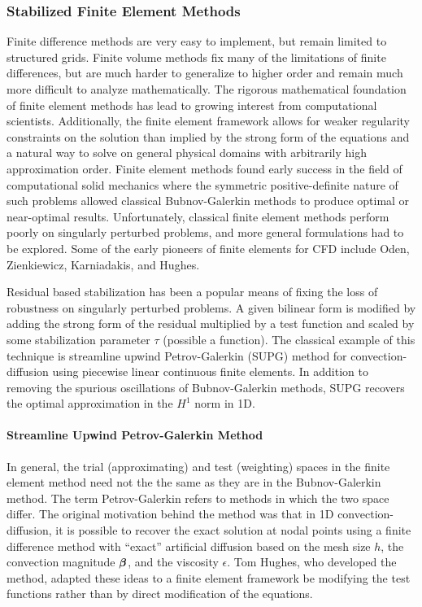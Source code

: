 \documentclass[Dissertation.tex]{subfiles}
\begin{document}
\subsubsection{Stabilized Finite Element Methods}
Finite difference methods are very easy to implement, but remain limited to structured grids.
Finite volume methods fix many of the limitations of finite differences,
but are much harder to generalize to higher order and remain much more difficult to analyze mathematically.
The rigorous mathematical foundation of finite element methods has lead to growing interest from computational scientists.
Additionally, the finite element framework allows for weaker regularity constraints on the solution than implied by the strong form of the equations
and a natural way to solve on general physical domains with arbitrarily high approximation order.
Finite element methods found early success in the field of computational solid mechanics where the symmetric positive-definite nature of such problems
allowed classical Bubnov-Galerkin methods to produce optimal or near-optimal results.
Unfortunately, classical finite element methods perform poorly on singularly perturbed problems,
and more general formulations had to be explored.
Some of the early pioneers of finite elements for CFD include Oden, Zienkiewicz, Karniadakis, and Hughes\cite{ChungCFD}.

Residual based stabilization has been a popular means of fixing the loss of robustness on singularly perturbed problems.
A given bilinear form is modified by adding the strong form of the residual multiplied by a test function and scaled by some
stabilization parameter $\tau$ (possible a function).
The classical example of this technique is streamline upwind Petrov-Galerkin (SUPG) method for convection-diffusion using piecewise linear
continuous finite elements\cite{SUPG}.
In addition to removing the spurious oscillations of Bubnov-Galerkin methods, SUPG recovers the optimal approximation in the $H^1$ norm in 1D.

\paragraph{Streamline Upwind Petrov-Galerkin Method}
In general, the trial (approximating) and test (weighting) spaces in the finite element method need not the the same as they are in the Bubnov-Galerkin method.
The term Petrov-Galerkin refers to methods in which the two space differ.
The original motivation behind the method was that in 1D convection-diffusion, it is possible to recover the exact solution at nodal points
using a finite difference method with ``exact'' artificial diffusion based on the mesh size $h$,
the convection magnitude $\boldsymbol\beta$, and the viscosity $\epsilon$.
Tom Hughes, who developed the method, adapted these ideas to a finite element framework be modifying the test functions rather than by direct
modification of the equations.
\end{document}
